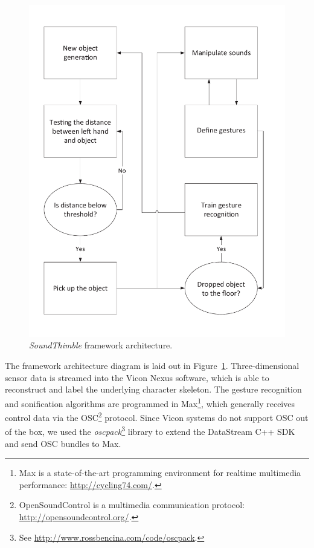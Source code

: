 \documentclass{nime-alternate}
\begin{document}

\begin{figure}[t]
	\centering
	\includegraphics[width=.8\columnwidth]{img/concept}
	\caption{\textit{SoundThimble} framework architecture.}
	\label{fig:archi}
\end{figure}

The framework architecture diagram is laid out in Figure~\ref{fig:archi}. Three-dimensional sensor data is streamed into the Vicon Nexus software, which is able to reconstruct and label the underlying character skeleton. The gesture recognition and sonification algorithms are programmed in Max\footnote{Max is a state-of-the-art programming environment for realtime multimedia performance: \url{http://cycling74.com/}.}, which generally receives control data via the OSC\footnote{OpenSoundControl is a multimedia communication protocol: \url{http://opensoundcontrol.org/}.} protocol. Since Vicon systems do not support OSC out of the box, we used the \textit{oscpack}\footnote{See \url{http://www.rossbencina.com/code/oscpack}.} library to extend the DataStream C++ SDK and send OSC bundles to Max.
\end{document}
